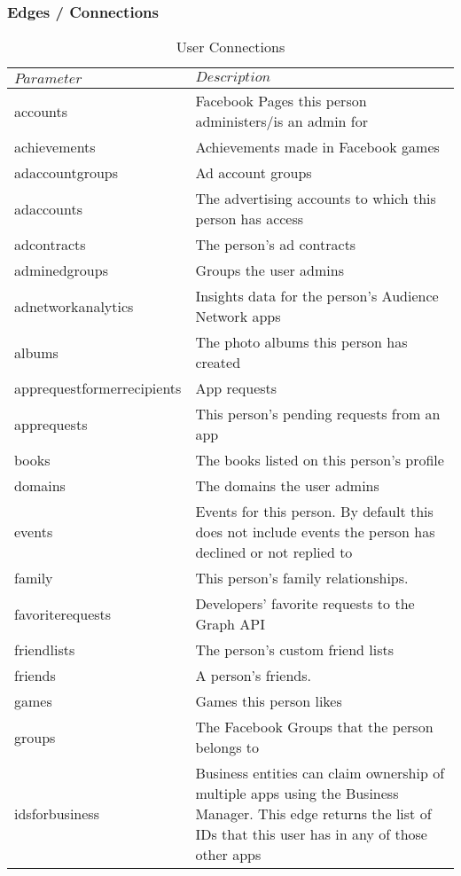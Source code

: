 \documentclass{article}
\begin{document}
	\subsubsection{Edges / Connections}
		\begin{table}[H]
		\centering
		\caption{User Connections}
		\label{my-label}
		\begin{tabularx}{\textwidth}{|l|X|}
		\hline
		$Parameter$ & $Description$ 	\\ \hline
		accounts 				& Facebook Pages this person administers/is an admin for \\ \hline
		achievements 				& Achievements made in Facebook games \\ \hline
		adaccountgroups 				& Ad account groups \\ \hline
		adaccounts 				& The advertising accounts to which this person has access \\ \hline
		adcontracts 				& The person's ad contracts \\ \hline
		admined\textunderscore groups 				& Groups the user admins \\ \hline
		adnetworkanalytics 				& Insights data for the person's Audience Network apps \\ \hline
		albums 				& The photo albums this person has created \\ \hline
		apprequestformerrecipients 				& App requests \\ \hline
		apprequests 				& This person's pending requests from an app \\ \hline
		books 				& The books listed on this person's profile \\ \hline
		domains 				& The domains the user admins \\ \hline
		events 				& Events for this person. By default this does not include events the person has declined or not replied to \\ \hline
		family 				& This person's family relationships. \\ \hline
		favorite\textunderscore requests 				& Developers' favorite requests to the Graph API \\ \hline
		friendlists 				& The person's custom friend lists \\ \hline
		friends 				& A person's friends. \\ \hline
		games 				& Games this person likes \\ \hline
		groups 				& The Facebook Groups that the person belongs to \\ \hline
		ids\textunderscore for\textunderscore business 				& Business entities can claim ownership of multiple apps using the Business Manager. This edge returns the list of IDs that this user has in any of those other apps \\ \hline

\end{tabularx}
\end{table}
\end{document}
